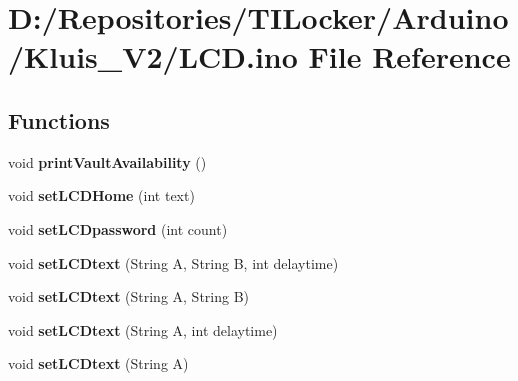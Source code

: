 \hypertarget{_l_c_d_8ino}{}\section{D\+:/\+Repositories/\+T\+I\+Locker/\+Arduino/\+Kluis\+\_\+\+V2/\+L\+CD.ino File Reference}
\label{_l_c_d_8ino}
\subsection*{Functions}
\begin{DoxyCompactItemize}
\item 
\mbox{\label{_l_c_d_8ino_abffe61d30333114721c9b84906a609b1}} 
void {\bfseries print\+Vault\+Availability} ()
\item 
\mbox{\label{_l_c_d_8ino_a39b88b9637689d4d116c669a36be3ab7}} 
void {\bfseries set\+L\+C\+D\+Home} (int text)
\item 
\mbox{\label{_l_c_d_8ino_a706d5f8647a0cef66c202002e6f8931e}} 
void {\bfseries set\+L\+C\+Dpassword} (int count)
\item 
\mbox{\label{_l_c_d_8ino_a79a24c0870863da2bc78cf71091cc110}} 
void {\bfseries set\+L\+C\+Dtext} (String A, String B, int delaytime)
\item 
\mbox{\label{_l_c_d_8ino_ad5a400dc2dbd7dc022104d26d57784a1}} 
void {\bfseries set\+L\+C\+Dtext} (String A, String B)
\item 
\mbox{\label{_l_c_d_8ino_a136e4e9d5e11104967fa6ca6349bf365}} 
void {\bfseries set\+L\+C\+Dtext} (String A, int delaytime)
\item 
\mbox{\label{_l_c_d_8ino_a40f62e0ad1eae0c265e371d2acfaee76}} 
void {\bfseries set\+L\+C\+Dtext} (String A)
\end{DoxyCompactItemize}
